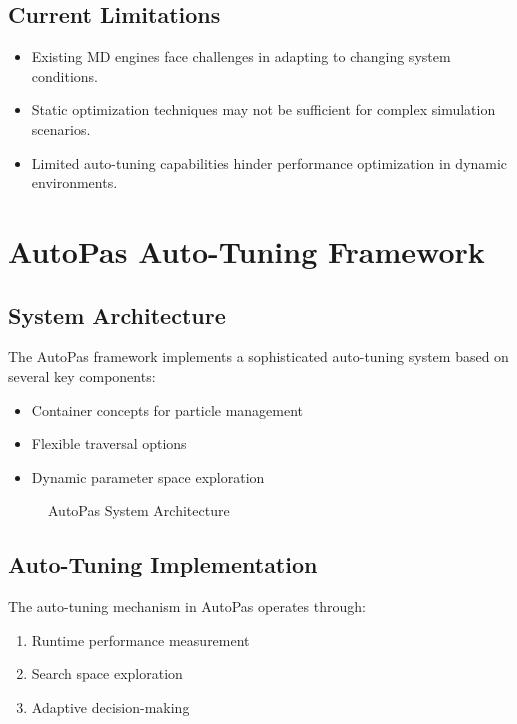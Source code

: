 \documentclass[conference]{IEEEtran}
\begin{document}
\subsection{Current Limitations}

\begin{itemize}
    \item Existing MD engines face challenges in adapting to changing system conditions.
    \item Static optimization techniques may not be sufficient for complex simulation scenarios.
    \item Limited auto-tuning capabilities hinder performance optimization in dynamic environments.
\end{itemize}


\section{AutoPas Auto-Tuning Framework}
\subsection{System Architecture}
The AutoPas framework implements a sophisticated auto-tuning system based on several key components:

\begin{itemize}
    \item Container concepts for particle management
    \item Flexible traversal options
    \item Dynamic parameter space exploration
\end{itemize}

\begin{figure}[!t]
    \centering
    \caption{AutoPas System Architecture}
    \label{fig_architecture}
\end{figure}

\subsection{Auto-Tuning Implementation}
The auto-tuning mechanism in AutoPas operates through:

\begin{enumerate}
    \item Runtime performance measurement
    \item Search space exploration
    \item Adaptive decision-making
\end{enumerate}
\end{document}
